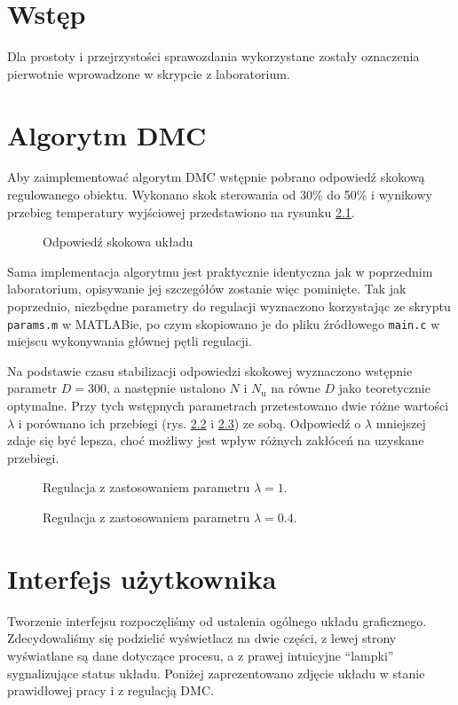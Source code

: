 \chapter{Wstęp}
Dla prostoty i przejrzystości sprawozdania wykorzystane zostały oznaczenia pierwotnie wprowadzone w skrypcie z laboratorium\@.

\chapter{Algorytm DMC}

Aby zaimplementować algorytm DMC wstępnie pobrano odpowiedź skokową regulowanego obiektu. Wykonano skok sterowania od 30\% do 50\% i wynikowy przebieg temperatury wyjściowej przedstawiono na rysunku \ref{step}.

\begin{figure}[H]
	\centering
	
	\caption{Odpowiedź skokowa układu}
	\label{step}
\end{figure}

Sama implementacja algorytmu jest praktycznie identyczna jak w poprzednim laboratorium, opisywanie jej szczegółów zostanie więc pominięte. Tak jak poprzednio, niezbędne parametry do regulacji wyznaczono korzystając ze skryptu \verb|params.m| w MATLABie, po czym skopiowano je do pliku źródłowego \verb|main.c| w miejscu wykonywania głównej pętli regulacji.

Na podstawie czasu stabilizacji odpowiedzi skokowej wyznaczono wstępnie parametr $ D = 300 $, a następnie ustalono $ N $ i $ N_\mathrm{u} $ na równe $ D $ jako teoretycznie optymalne. Przy tych wstępnych parametrach przetestowano dwie różne wartości $ \lambda $ i porównano ich przebiegi (rys. \ref{DMC1} i \ref{DMC2}) ze sobą. Odpowiedź o $ \lambda $ mniejszej zdaje się być lepsza, choć możliwy jest wpływ różnych zakłóceń na uzyskane przebiegi.


\begin{figure}[ht]
\centering

\caption{Regulacja z zastosowaniem parametru $ \lambda=1 $.}
\label{DMC1}
\end{figure}

\begin{figure}[H]
\centering

\caption{Regulacja z zastosowaniem parametru $ \lambda=\num{0,4} $.}
\label{DMC2}
\end{figure}


\chapter{Interfejs użytkownika}
Tworzenie interfejsu rozpoczęliśmy od ustalenia ogólnego układu graficznego. Zdecydowaliśmy się podzielić wyświetlacz na dwie części, z lewej strony wyświatlane są dane dotyczące procesu, a z prawej intuicyjne ``lampki'' sygnalizujące status układu. Poniżej zaprezentowano zdjęcie układu w stanie prawidłowej pracy i z regulacją DMC.


